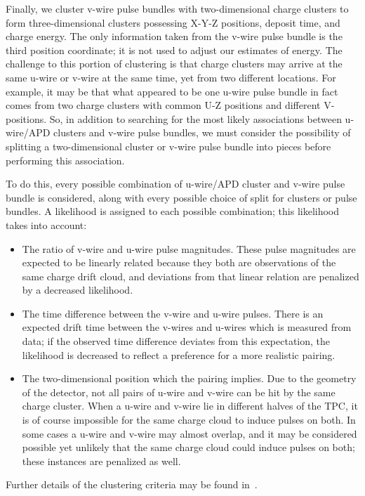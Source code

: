 Finally, we cluster v-wire pulse bundles with two-dimensional charge clusters to form three-dimensional clusters possessing X-Y-Z positions, deposit time, and charge energy.  The only information taken from the v-wire pulse bundle is the third position coordinate; it is not used to adjust our estimates of energy.  The challenge to this portion of clustering is that charge clusters may arrive at the same u-wire or v-wire at the same time, yet from two different locations.  For example, it may be that what appeared to be one u-wire pulse bundle in fact comes from two charge clusters with common U-Z positions and different V-positions.  So, in addition to searching for the most likely associations between u-wire/APD clusters and v-wire pulse bundles, we must consider the possibility of splitting a two-dimensional cluster or v-wire pulse bundle into pieces before performing this association.

To do this, every possible combination of u-wire/APD cluster and v-wire pulse bundle is considered, along with every possible choice of split for clusters or pulse bundles.  A likelihood is assigned to each possible combination; this likelihood takes into account:
\begin{itemize}
\item The ratio of v-wire and u-wire pulse magnitudes.  These pulse magnitudes are expected to be linearly related because they both are observations of the same charge drift cloud, and deviations from that linear relation are penalized by a decreased likelihood.
\item The time difference between the v-wire and u-wire pulses.  There is an expected drift time between the v-wires and u-wires which is measured from data; if the observed time difference deviates from this expectation, the likelihood is decreased to reflect a preference for a more realistic pairing.
\item The two-dimensional position which the pairing implies.  Due to the geometry of the detector, not all pairs of u-wire and v-wire can be hit by the same charge cluster.  When a u-wire and v-wire lie in different halves of the TPC, it is of course impossible for the same charge cloud to induce pulses on both.  In some cases a u-wire and v-wire may almost overlap, and it may be considered possible yet unlikely that the same charge cloud could induce pulses on both; these instances are penalized as well.
\end{itemize}
Further details of the clustering criteria may be found in~\cite{ReconstructionDocument}.

